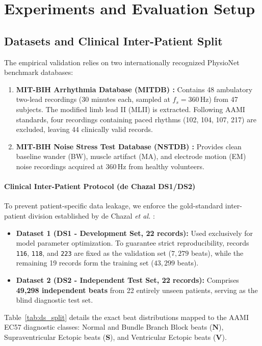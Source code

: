 \section{Experiments and Evaluation Setup}
\label{sec:exp}

\subsection{Datasets and Clinical Inter-Patient Split}
\label{sec:data_split}
The empirical validation relies on two internationally recognized PhysioNet benchmark databases:
\begin{enumerate}
    \item \textbf{MIT-BIH Arrhythmia Database (MITDB) \cite{moody2001}:} Contains 48 ambulatory two-lead recordings (30 minutes each, sampled at $f_s = 360$\,Hz) from 47 subjects. The modified limb lead II (MLII) is extracted. Following AAMI standards, four recordings containing paced rhythms (102, 104, 107, 217) are excluded, leaving 44 clinically valid records.
    \item \textbf{MIT-BIH Noise Stress Test Database (NSTDB) \cite{moody1984}:} Provides clean baseline wander (BW), muscle artifact (MA), and electrode motion (EM) noise recordings acquired at 360\,Hz from healthy volunteers.
\end{enumerate}

\paragraph*{Clinical Inter-Patient Protocol (de Chazal DS1/DS2)}
To prevent patient-specific data leakage, we enforce the gold-standard inter-patient division established by de Chazal \emph{et al.} \cite{dechazal2004}:
\begin{itemize}
    \item \textbf{Dataset 1 (DS1 - Development Set, 22 records):} Used exclusively for model parameter optimization. To guarantee strict reproducibility, records \texttt{116}, \texttt{118}, and \texttt{223} are fixed as the validation set ($7{,}279$ beats), while the remaining 19 records form the training set ($43{,}299$ beats).
    \item \textbf{Dataset 2 (DS2 - Independent Test Set, 22 records):} Comprises \textbf{49{,}298 independent beats} from 22 entirely unseen patients, serving as the blind diagnostic test set.
\end{itemize}
Table~\ref{tab:ds_split} details the exact beat distributions mapped to the AAMI EC57 diagnostic classes: Normal and Bundle Branch Block beats ($\mathbf{N}$), Supraventricular Ectopic beats ($\mathbf{S}$), and Ventricular Ectopic beats ($\mathbf{V}$).

